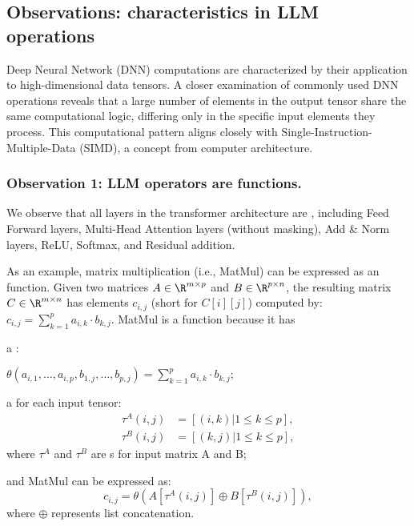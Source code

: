 \subsection{Observations: \simd{} characteristics in LLM operations}

Deep Neural Network (DNN) computations are characterized by their application
to high-dimensional data tensors. A closer examination of commonly used DNN
operations reveals that a large number of elements in the output tensor share
the same computational logic, differing only in the specific input elements
they process. This computational pattern aligns closely with
Single-Instruction-Multiple-Data (SIMD), a concept from computer architecture.


\subsubsection{Observation 1: LLM operators are \simd{} functions.}
We observe that all layers in the transformer architecture are \simd{},
including Feed Forward layers,
Multi-Head Attention layers (without masking),
Add \& Norm layers, ReLU, Softmax,
and Residual addition.

As an example, matrix multiplication (i.e., MatMul) can be expressed as an \simd{} function.
Given two matrices $A \in \R^{m \times p}$ and $B \in \R^{p \times n}$,
the resulting matrix $C \in \R^{m \times n}$ has elements $c_{i,j}$ (short for $C[i][j]$)
computed by:
$c_{i,j} = \sum_{k=1}^{p} a_{i,k} \cdot b_{k,j}$.
MatMul is a \simd{} function because it has
\begin{myitemize2}

\item a \kfunc:
    \begin{center}
    $\theta(a_{i,1},\dots, a_{i,p}, b_{1,j}, \dots, b_{p,j}) = \sum_{k=1}^{p} a_{i,k} \cdot b_{k,j};$
    \end{center}

\item a \depmap for each input tensor:
  \begin{align*}
    \tau^{A}(i,j) &= [(i, k) | 1 \leq k \leq p],\\
    \tau^{B}(i,j) &= [(k, j) | 1 \leq k \leq p],
  \end{align*}
  where $\tau^A$ and $\tau^B$ are \depmap{}s for input matrix A and B;

\item and MatMul can be expressed as:
\[
c_{i,j} = \theta(A[\tau^A(i,j)] \oplus B[\tau^B(i,j)]),
\]
where $\oplus$ represents list concatenation.

\end{myitemize2}



